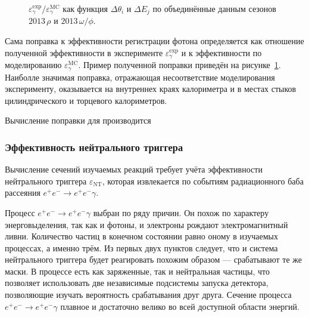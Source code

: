 \begin{figure}[htbp]
\begin{minipage}[t]{0.48\textwidth}
        \caption{$\varepsilon_{\gamma}^{\text{exp}} / \varepsilon_{\gamma}^{\text{MC}}$ как функция $\Delta \theta_i$ и $\Delta E_j$
        	по объединённые данным сезонов $2013 \, \rho$ и $2013 \, \omega / \phi$.}\label{fig:3pi_eff_gamma_corr}
    \end{minipage}
\end{figure}

Сама поправка к эффективности регистрации фотона определяется как отношение полученной эффективности в эксперименте $\varepsilon_{\gamma}^{\text{exp}}$
и к эффективности по моделированию $\varepsilon_{\gamma}^{\text{MC}}$.
Пример полученной поправки приведён на рисунке~\ref{fig:3pi_eff_gamma_corr}.
Наиболле значимая поправка,
отражающая несоответствие моделирования эксперименту,
оказывается на внутреннех краях  калориметра и в местах стыков цилиндрического и торцевого калориметров.

Вычисление поправки для производится




\subsubsection{Эффективность нейтрального триггера}

Вычисление сечений изучаемых реакций требует учёта эффективности нейтрального триггера $\varepsilon_\text{NT}$,
которая извлекается по событиям радиационного баба рассеяния $e^+e^- \to e^+e^-\gamma$.


Процесс $e^+e^- \to e^+e^-\gamma$ выбран по ряду причин.
Он похож по характеру энерговыделения,
так как и фотоны,
и электроны рождают электромагнитный ливни.
Количество частиц в конечном состоянии равно оному в изучаемых процессах,
а именно трём.
Из первых двух пунктов следует,
что и система нейтрального триггера будет реагировать похожим образом
---
срабатывают те же маски.
В процессе есть как заряженные,
так и нейтральная частицы,
что позволяет использовать две независимые подсистемы запуска детектора,
позволяющие изучать вероятность срабатывания друг друга.
Сечение процесса $e^+e^- \to e^+ e^- \gamma$ плавное и достаточно велико во всей доступной области энергий.



